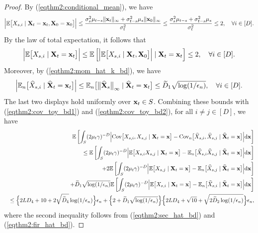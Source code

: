 \documentclass[11pt,a4paper,final]{article}
\numberwithin{equation}{section}
\theoremstyle{remark}
\newcommand{\bx}{{\bf x}}
\newcommand{\bX}{{\bf X}}
\newcommand{\bbE}{{\mathbb E}}
\newcommand{\bean}{\setlength\arraycolsep{1pt}\begin{eqnarray*}}
\newcommand{\eean}{\end{eqnarray*}}
\def\d{{\rm d}}
\begin{document}
\begin{proof}
By (\ref{eqthm2:conditional_mean}), we have
\bean
\Big\vert \bbE \big[ X_{s,i} \mid \bX_{t} = \bx_{t}, \bX_{0} = \bx_{0} \big] \Big\vert
\leq  \frac{ \sigma_{s}^2 \mu_{t-s} \| \bx_{t} \|_{\infty} + \sigma_{t-s}^2 \mu_{s} \| \bx_{0} \|_{\infty} }{\sigma_{t}^2}
\leq \frac{ \sigma_{s}^2 \mu_{t-s}  + \sigma_{t-s}^2 \mu_{s} }{\sigma_{t}^2}
\leq 2
, \quad \forall i \in [D].
\eean
By the law of total expectation, it follows that
\bean
\Big\vert \bbE \big[ X_{s,i} \mid \bX_{t} = \bx_{t} \big] \Big\vert
\leq
\bbE \left[ \Big\vert \bbE \big[ X_{s,i} \mid \bX_{t}, \bX_{0} \big] \Big\vert \mid \bX_{t} = \bx_{t} \right]
\leq 2,
\quad \forall i \in [D].
\eean
Moreover, by (\ref{eqthm2:mom_hat_k_bd}), we have
\bean
\Big\vert \bbE_{n} \big[ \widehat X_{s,i} \mid \widehat \bX_{t} = \bx_{t} \big] \Big\vert
\leq
\bbE_{n} \big[ \big\| \widehat \bX_{s} \big\|_{\infty} \mid \widehat \bX_{t} = \bx_{t} \big]
\leq \widetilde D_{1} \sqrt{ \log (1/\epsilon_n) } , \quad \forall i \in [D].
\eean
The last two displays hold uniformly over $\bx_{t} \in S$.
Combining these bounds with (\ref{eqthm2:cov_toy_bd1}) and (\ref{eqthm2:cov_toy_bd2}), for all $i \neq j \in [D]$, we have
\bean
&& \bbE \left[
\int_{S}   ( 2\mu_{t} \gamma)^{-D} \Big\vert \text{Cov} \big[ X_{s,i}, X_{s,j} \mid \bX_{t} = \bx \big]  -
\text{Cov}_n \big[ \widehat X_{s,i}, \widehat X_{s,j} \mid  \widehat \bX_{t} = \bx \big] \Big\vert
 \d \bx \right]
 \\
 && \leq \bbE \left[
\int_{S}   ( 2\mu_{t} \gamma)^{-D} \Big\vert \bbE \big[ X_{s,i} X_{s,j} \mid \bX_{t} = \bx \big]  -
\bbE_n \big[ \widehat X_{s,i} \widehat X_{s,j} \mid  \widehat \bX_{t} = \bx \big] \Big\vert \d \bx \right]
\\
&& \quad + 2 \bbE \left[
\int_{S}   ( 2\mu_{t} \gamma)^{-D} \Big\vert \bbE \big[ X_{s,j}\mid \bX_{t} = \bx \big]  -
\bbE_n \big[ \widehat X_{s,j}  \mid  \widehat \bX_{t} = \bx \big] \Big\vert \d \bx \right]
\\
&& \quad + \widetilde D_{1} \sqrt{ \log (1/\epsilon_n) }
\bbE \left[
\int_{S}   ( 2\mu_{t} \gamma)^{-D} \Big\vert \bbE \big[ X_{s,i}\mid \bX_{t} = \bx \big]  -
\bbE_n \big[ \widehat X_{s,i}  \mid  \widehat \bX_{t} = \bx \big] \Big\vert \d \bx \right]
\\
&& \leq \Big\{ 2 L D_{4}  + 10 + 2 \sqrt{\widetilde D_{4}} \log (1/\epsilon_n) \Big\} \epsilon_n
+ \Big\{ 2 + \widetilde D_{1} \sqrt{ \log (1/\epsilon_n) } \Big\}
\Big\{ 2 L D_{4} + \sqrt{10} + \sqrt{ 2 \widetilde D_{2} \log (1/\epsilon_n) } \Big\} \epsilon_n,
\eean
where the second inequality follows from (\ref{eqthm2:sec_hat_bd}) and (\ref{eqthm2:fir_hat_bd}).

\end{proof}
\end{document}
